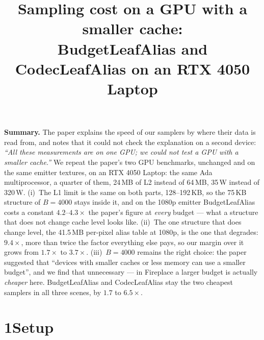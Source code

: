 \documentclass[10pt]{article}
\title{\vspace{-1.6em}Sampling cost on a GPU with a smaller cache:\\ BudgetLeafAlias and CodecLeafAlias on an RTX 4050 Laptop}
\author{}
\date{\vspace{-2.4em}}
\begin{document}
\maketitle
\vspace{-1.0em}

\textbf{Summary.} The paper explains the speed of our samplers by where their data is read from, and
notes that it could not check the explanation on a second device: \emph{``All these measurements are
on one GPU; we could not test a GPU with a smaller cache.''} We repeat the paper's two GPU
benchmarks, unchanged and on the same emitter textures, on an RTX 4050 Laptop: the same Ada
multiprocessor, a quarter of them, 24\,MB of L2 instead of 64\,MB, 35\,W instead of 320\,W. (i)~The
L1 limit is the same on both parts, 128--192\,KB, so the 75\,KB structure of $B=4000$ stays inside
it, and on the 1080p emitter BudgetLeafAlias costs a constant $4.2$--$4.3\times$ the paper's figure
at \emph{every} budget --- what a structure that does not change cache level looks like. (ii)~The one
structure that does change level, the 41.5\,MB per-pixel alias table at 1080p, is the one that
degrades: $9.4\times$, more than twice the factor everything else pays, so our margin over it grows
from $1.7\times$ to $3.7\times$. (iii)~$B=4000$ remains the right choice: the paper suggested that
``devices with smaller caches or less memory can use a smaller budget'', and we find that
unnecessary --- in Fireplace a larger budget is actually \emph{cheaper} here. BudgetLeafAlias and
CodecLeafAlias stay the two cheapest samplers in all three scenes, by $1.7$ to $6.5\times$.

\section*{1\quad Setup}
\end{document}

